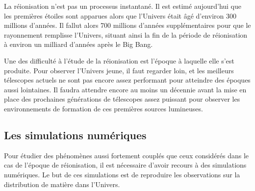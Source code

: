 La réionisation n'est pas un processus instantané.
Il est estimé aujourd'hui que les premières étoiles sont apparues alors que l'Univers était âgé d'environ 300 millions d'années. 
Il fallut alors 700 millions d'années supplémentaires pour que le rayonnement remplisse l'Univers, situant ainsi la fin de la période de réionisation à environ un milliard d'années après le Big Bang.


Une des difficulté à l'étude de la réionisation est l'époque à laquelle elle s'est produite. %
Pour observer l'Univers jeune, il faut regarder loin, et les meilleurs télescopes actuels ne sont pas encore assez performant pour atteindre des époques aussi lointaines.
Il faudra attendre encore au moins un décennie avant la mise en place des prochaines générations de télescopes assez puissant pour observer les environnements de formation de ces premières sources lumineuses.

\subsection*{Les simulations numériques}
Pour étudier des phénomènes aussi fortement couplés que ceux considérés dans le cas de l'époque de réionisation, il est nécessaire d'avoir recours à des simulations numériques. 
Le but de ces simulations est de reproduire les observations sur la distribution de matière dans l'Univers.

